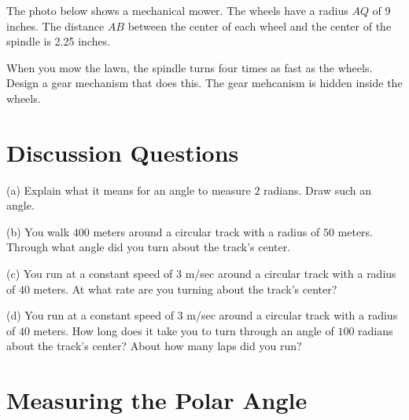 \documentclass{ximera}
\begin{document}
\begin{question}    \label{Q850:Angles}
The photo below shows a mechanical mower. The wheels have a radius $AQ$ of 9 inches. The distance $AB$ between the center of each wheel and the center of the spindle is 2.25 inches. 

When you mow the lawn, the spindle turns four times as fast as the wheels. Design a gear mechanism that does this. The gear mehcanism is hidden inside the wheels.




 
\begin{onlineOnly}
    \begin{center}
\end{center}
\end{onlineOnly}
\end{question}




\section{Discussion Questions}
\begin{question}  \label{Q2873:Angles}
(a) Explain what it means for an angle to measure $2$ radians. Draw such an angle.

(b) You walk $400$ meters around a circular track with a radius of $50$ meters. Through what angle did you turn about the track's center.

(c) You run at a constant speed of $3$ m/sec around a circular track with a radius of $40$ meters. At what rate are you turning about the track's center?

(d) You run at a constant speed of $3$ m/sec around a circular track with a radius of $40$ meters. How long does it take you to turn through an angle of $100$ radians about the track's center? About how many laps did you run?


\end{question}




\section{Measuring the Polar Angle}


\end{document}
